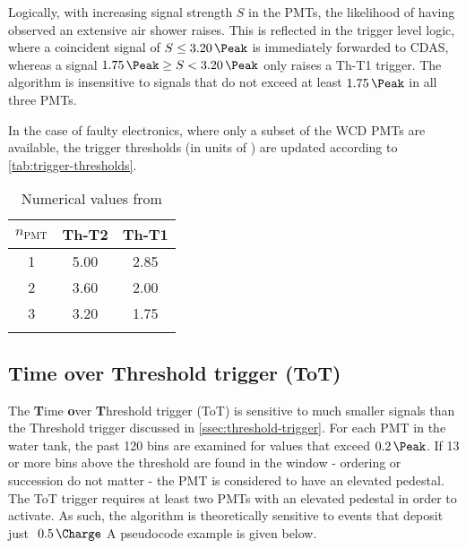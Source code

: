 Logically, with increasing signal strength $S$ in the PMTs, the likelihood of having observed an extensive air shower raises. This is reflected in the trigger 
level logic, where a coincident signal of $S\leq\SI{3.20}{\Peak}$ is immediately forwarded to CDAS, whereas a signal $\SI{1.75}{\Peak}\geq S<\SI{3.20}{\Peak}$ 
only raises a Th-T1 trigger. The algorithm is insensitive to signals that do not exceed at least $\SI{1.75}\Peak$ in all three PMTs.

In the case of faulty electronics, where only a subset of the WCD PMTs are available, the trigger thresholds (in units of \SI{}{\Peak}) are updated according to 
\autoref{tab:trigger-thresholds}.

\begin{table}[h]
	\begin{center}
	\caption{Numerical values from \cite{triggerSettings}}
	\begin{tabular*}{0.4\textwidth}{@{\extracolsep{\fill}} ccc}
		\toprule
		$n_\text{PMT}$ & Th-T2 & Th-T1 \\
		\midrule
		1 & 5.00 & 2.85 \\
		2 & 3.60 & 2.00 \\
		3 & 3.20 & 1.75 \\
		\bottomrule
	\label{tab:trigger-thresholds}
	\end{tabular*}
	\end{center}
\end{table}

\subsection{Time over Threshold trigger (ToT)}
\label{ssec:time-over-threshold-trigger}

The \textbf{T}ime \textbf{o}ver \textbf{T}hreshold trigger (ToT) is sensitive to much smaller signals than the Threshold trigger discussed in 
\autoref{ssec:threshold-trigger}. For each PMT in the water tank, the past 120 bins are examined for values that exceed $\SI{0.2}{\Peak}$. If 13 or more bins
above the threshold are found in the window - ordering or succession do not matter - the PMT is considered to have an elevated pedestal. The ToT trigger requires
at least two PMTs with an elevated pedestal in order to activate. As such, the algorithm is theoretically sensitive to events that deposit just $~\SI{0.5}{\Charge}$ 
A pseudocode example is given below.

